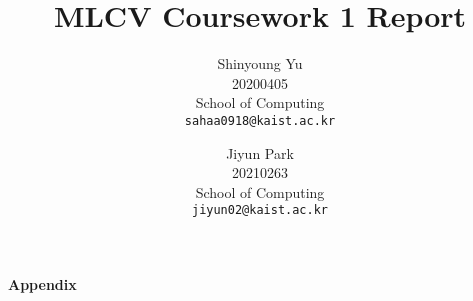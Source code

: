 \documentclass[10pt,twocolumn,letterpaper]{article}
\begin{document}
\title{MLCV Coursework 1 Report}

\author{Shinyoung Yu\\
20200405\\
School of Computing\\
{\tt\small sahaa0918@kaist.ac.kr}
\and
Jiyun Park\\
20210263\\
School of Computing\\
{\tt\small jiyun02@kaist.ac.kr}
}

\maketitle

%    






\onecolumn
\newpage
{\LARGE 
	\textbf{Appendix}\par}
\appendix


{
    \small
    
    
}

% 
\end{document}

